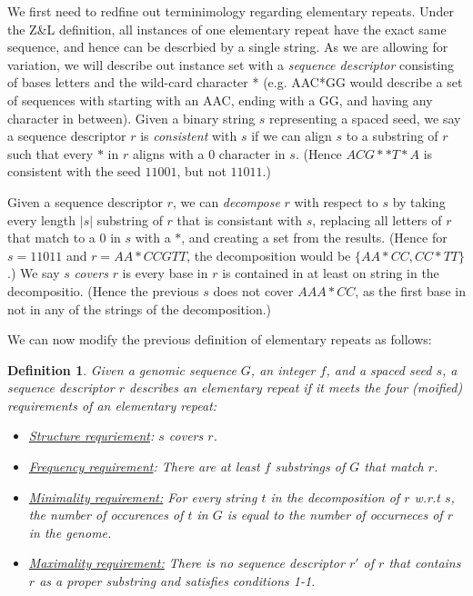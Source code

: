 \documentclass[11pt]{article}
\newtheorem{definition}{Definition}
\begin{document}
We first need to redfine out terminimology regarding elementary
repeats.  Under the Z\&L definition, all instances of one elementary
repeat have the exact same sequence, and hence can be descrbied by a
single string.  As we are allowing for variation, we will describe out
instance set with a {\it sequence descriptor} consisting of bases
letters and the wild-card character * (e.g. AAC*GG would describe a
set of sequences with starting with an AAC, ending with a GG, and
having any character in between).  Given a binary string $s$
representing a spaced seed, we say a sequence descriptor $r$ is
{\it consistent} with $s$ if we can align $s$ to a substring of $r$ such
that every $*$ in $r$ aligns with a $0$ character in $s$. (Hence
$ACG**T*A$ is consistent with the seed $11001$, but not $11011$.) 

Given a sequence descriptor $r$, we can {\it decompose} $r$ with
respect to $s$ by taking every length $|s|$ substring of $r$ that is consistant
with $s$, replacing all letters of $r$ that match to a 0 in $s$ with a
$*$, and creating a set from the results.  (Hence for $s = 11011$ and
$r=AA*CCGTT$, the decomposition would be $\{AA*CC, CC*TT\}$.)  We say
$s$ {\it covers} $r$ is every base in $r$ is contained in at least on
string in the decompositio.  (Hence the previous $s$ does not cover $AAA*CC$, as
the first base in not in any of the strings of the decomposition.)


We can now modify the previous definition of elementary repeats as
follows:
\begin{definition} Given a genomic sequence $G$, an integer $f$, and a
  spaced seed $s$, a sequence descriptor $r$ describes an elementary
  repeat if it meets the four (moified) requirements of an elementary repeat:
\begin{itemize}
\item \underline{Structure requriement}: $s$ covers $r$.
\item \underline{Frequency requirement}: There are at least $f$
  substrings of $G$ that match $r$.
\item \underline{Minimality requirement:} For every string $t$ in the
  decomposition of $r$ w.r.t $s$, the number of occurences of $t$ in
  $G$ is equal to the number of occurneces of $r$ in the genome.
\item \underline{Maximality requirement:} There is no sequence
  descriptor $r'$ of $r$ that contains $r$ as a proper substring and
  satisfies conditions 1-1.
\end{itemize}
\end{definition}
\end{document}
